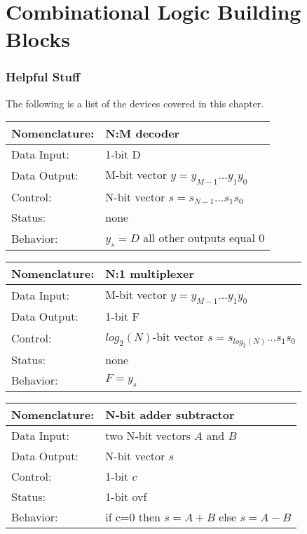 \chapter{Combinational Logic Building Blocks}
\graphicspath{ {./chapter04/FigWork} }

\subsection{Helpful Stuff}
The following is a list of the devices covered in this chapter.

\begin{tabular}{|l|p{3.5in}|} \hline
    Nomenclature:  & N:M decoder                \\ \hline
    Data Input:    & 1-bit D        \\ \hline
    Data Output:   & M-bit vector $y = y_{M-1} \ldots y_1 y_0$    \\ \hline
    Control:       & N-bit vector $s = s_{N-1} \ldots s_1 s_0$    \\ \hline
    Status:        & none                    \\ \hline
    Behavior:      & $y_s = D$ all other outputs equal 0    \\ \hline
\end{tabular}

\begin{tabular}{|l|p{3.5in}|} \hline
    Nomenclature:  & N:1 multiplexer                        \\ \hline
    Data Input:    & M-bit vector $y=y_{M-1} \ldots y_1 y_0$    \\ \hline
    Data Output:   & 1-bit F          \\ \hline
    Control:       & $log_2(N)$-bit vector $s = s_{log_2(N)} \ldots s_1 s_0$    \\ \hline
    Status:        & none                                   \\ \hline
    Behavior:      & $F = y_s$                \\ \hline
\end{tabular}

\begin{tabular}{|l|p{3.5in}|} \hline
    Nomenclature:  & N-bit adder subtractor                 \\ \hline
    Data Input:    & two N-bit vectors $A$ and $B$           \\ \hline
    Data Output:   & N-bit vector  $s$               \\ \hline
    Control:       & 1-bit $c$                     \\ \hline
    Status:        & 1-bit ovf                 \\ \hline
    Behavior:      & if c=0 then $s = A+B$ else $s=A-B$     \\ \hline
\end{tabular}

